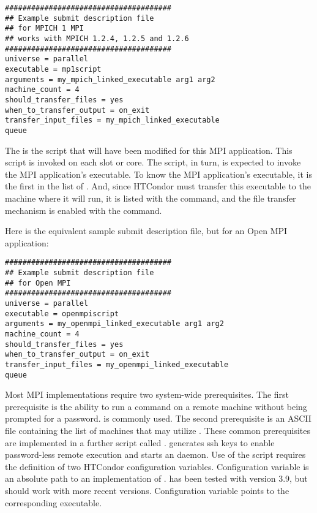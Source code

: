 \footnotesize
\begin{verbatim}
######################################
## Example submit description file
## for MPICH 1 MPI
## works with MPICH 1.2.4, 1.2.5 and 1.2.6
######################################
universe = parallel
executable = mp1script
arguments = my_mpich_linked_executable arg1 arg2
machine_count = 4
should_transfer_files = yes
when_to_transfer_output = on_exit
transfer_input_files = my_mpich_linked_executable
queue
\end{verbatim}
\normalsize

The  is the  script that will have been
modified for this MPI application.
This script is invoked on each slot or core.
The script, in turn, is expected to invoke the MPI application's executable.
To know the MPI application's executable,
it is the first in the list of .
And, since HTCondor must transfer this executable to the machine where
it will run,
it is listed with the  command,
and the file transfer mechanism is enabled with
the  command.

Here is the equivalent sample submit description file,
but for an Open MPI application:

\footnotesize
\begin{verbatim}
######################################
## Example submit description file
## for Open MPI
######################################
universe = parallel
executable = openmpiscript
arguments = my_openmpi_linked_executable arg1 arg2
machine_count = 4
should_transfer_files = yes
when_to_transfer_output = on_exit
transfer_input_files = my_openmpi_linked_executable
queue
\end{verbatim}
\normalsize

Most MPI implementations require two system-wide prerequisites.
The first prerequisite is the ability to run a command
on a remote machine without being prompted for a password.
 is commonly used.
The second prerequisite is an ASCII file containing the
list of machines that may utilize .
These common prerequisites are implemented in a further script
called .
 generates ssh keys to enable password-less remote execution
and starts an  daemon.
Use of the  script requires the definition of
two HTCondor configuration variables.
Configuration variable  is an absolute path to
an implementation of .
 has been tested with  version 3.9,
but should work with more recent versions.
Configuration variable  points
to the corresponding  executable.

